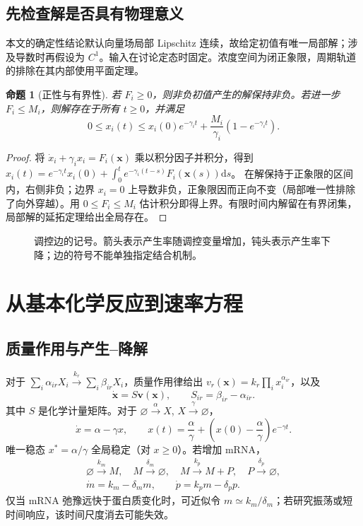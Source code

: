 \documentclass[11pt,a4paper,UTF8,fontset=fandol]{ctexart}
\newtheorem{proposition}{命题}[section]
\newcommand{\dd}{\mathrm d}\newcommand{\R}{\mathbb R}\newcommand{\ssv}{\mathrm{ss}}
\begin{document}
\subsection{先检查解是否具有物理意义}
本文的确定性结论默认向量场局部 Lipschitz 连续，故给定初值有唯一局部解；涉及导数时再假设为 $C^1$。输入在讨论定态时固定。浓度空间为闭正象限，周期轨道的排除在其内部使用平面定理。
\begin{proposition}[正性与有界性]\label{prop:positive}
若 $F_i\geq0$，则非负初值产生的解保持非负。若进一步 $F_i\leq M_i$，则解存在于所有 $t\geq0$，并满足
\[
0\leq x_i(t)\leq x_i(0)e^{-\gamma_it}+\frac{M_i}{\gamma_i}(1-e^{-\gamma_it}).
\]
\end{proposition}
\begin{proof}
将 $\dot x_i+\gamma_ix_i=F_i(\bm x)$ 乘以积分因子并积分，得到
$x_i(t)=e^{-\gamma_it}x_i(0)+\int_0^t e^{-\gamma_i(t-s)}F_i(\bm x(s))\dd s$。
在解保持于正象限的区间内，右侧非负；边界 $x_i=0$ 上导数非负，正象限因而正向不变（局部唯一性排除了向外穿越）。用 $0\leq F_i\leq M_i$ 估计积分即得上界。有限时间内解留在有界闭集，局部解的延拓定理给出全局存在。
\end{proof}
\begin{figure}[htbp]\centering
{}
\caption{调控边的记号。箭头表示产生率随调控变量增加，钝头表示产生率下降；边的符号不能单独指定结合机制。}\label{fig:signs}
\end{figure}


\section{从基本化学反应到速率方程}
\subsection{质量作用与产生--降解}
对于 $\sum_i\alpha_{ir}X_i\xrightarrow{k_r}\sum_i\beta_{ir}X_i$，质量作用律给出 $v_r(\bm x)=k_r\prod_i x_i^{\alpha_{ir}}$，以及
\begin{equation}\dot{\bm x}=S\bm v(\bm x),\qquad S_{ir}=\beta_{ir}-\alpha_{ir}.\end{equation}
其中 $S$ 是化学计量矩阵。对于 $\varnothing\xrightarrow{\alpha}X$, $X\xrightarrow{\gamma}\varnothing$，
\begin{equation}\dot x=\alpha-\gamma x,\qquad x(t)=\frac\alpha\gamma+\left(x(0)-\frac\alpha\gamma\right)e^{-\gamma t}.\end{equation}
唯一稳态 $x^*=\alpha/\gamma$ 全局稳定（对 $x\geq0$）。若增加 mRNA，
\begin{align}
\varnothing\xrightarrow{k_m}M,\quad M\xrightarrow{\delta_m}\varnothing,\quad M\xrightarrow{k_p}M+P,\quad P\xrightarrow{\delta_p}\varnothing,\\[-2pt]
\dot m=k_m-\delta_m m,\qquad\dot p=k_pm-\delta_p p.
\end{align}
仅当 mRNA 弛豫远快于蛋白质变化时，可近似令 $m\simeq k_m/\delta_m$；若研究振荡或短时间响应，该时间尺度消去可能失效。
\end{document}
